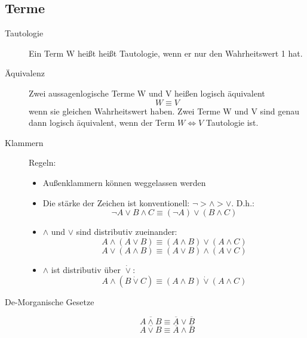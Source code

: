 \documentclass[12pt,a4paper]{article}
\begin{document}
\subsection{Terme}
\begin{description}
	\item[Tautologie] Ein Term W heißt heißt Tautologie, wenn er nur den Wahrheitswert 1 hat.
	\item[Äquivalenz] Zwei aussagenlogische Terme W und V heißen logisch äquivalent $$W \equiv V$$ wenn sie gleichen Wahrheitswert haben. Zwei Terme W und V sind genau dann logisch äquivalent, wenn der Term $W\Leftrightarrow V$ Tautologie ist.
	\item[Klammern] Regeln:
		\begin{itemize}
			\item Außenklammern können weggelassen werden
			\item Die stärke der Zeichen ist konventionell: $\neg > \wedge > \vee$. D.h.:
			      $$\neg A \vee B \wedge C \equiv (\neg A) \vee (B \wedge C)$$
			\item $\wedge$ und $\vee$ sind distributiv zueinander:
			      $$A \wedge (A \vee B) \equiv (A \wedge B) \vee (A \wedge C)$$
			      $$A \vee (A \wedge B) \equiv (A \vee B) \wedge (A \vee C)$$
			\item $\wedge$ ist distributiv über $\dot{\vee}$:
			      $$A \wedge (B \dot{\vee} C) \equiv (A \wedge B) \dot{\vee} (A \wedge C)$$
		\end{itemize}
	\item[De-Morganische Gesetze] $$\overline{A \wedge B} \equiv \overline{A} \vee \overline{B}$$ $$\overline{A \vee B} \equiv \overline{A} \wedge \overline{B}$$
\end{description}
\end{document}
